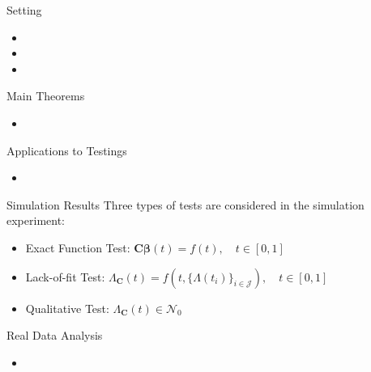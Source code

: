 \documentclass [aspectratio=169]{beamer}
\begin{document}
\begin{frame}{Setting}
    \begin{itemize}
        \item 
        \item 
        \item 
    \end{itemize}
\end{frame}

\begin{frame}{Main Theorems}
    \begin{itemize}
        \item 
    \end{itemize}
\end{frame}


\begin{frame}{Applications to Testings}
	\begin{itemize}
        \item 
    \end{itemize}
\end{frame}


\begin{frame}{Simulation Results}
Three types of tests are considered in the simulation experiment:
\begin{itemize}
    \item Exact Function Test: $\mathbf{C}\boldsymbol{\beta}(t) = f(t), \quad t \in [0,1]$
    \item Lack-of-fit Test: $\Lambda_{\mathbf{C}}(t) = f(t, \{\Lambda(t_i)\}_{i \in \mathcal{J}}), \quad t \in [0,1]$
    \item Qualitative Test: $\Lambda_{\mathbf{C}}(t) \in \mathcal{N}_0$
\end{itemize}
\end{frame}


\begin{frame}{Real Data Analysis}
    \begin{itemize}
    \item
    \end{itemize}
\end{frame}
\end{document}
